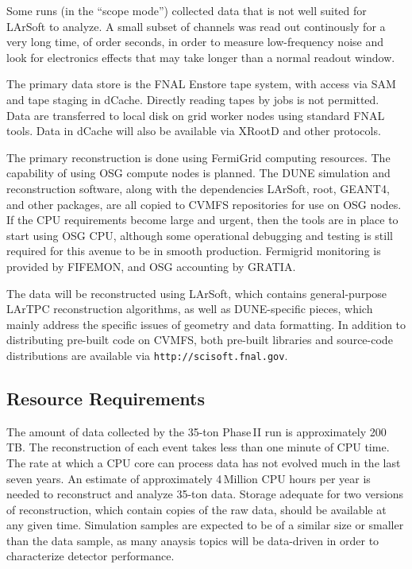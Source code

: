 \documentclass[12pt]{article}
\begin{document}
Some runs (in the ``scope mode'') collected data that is not well suited for LArSoft to analyze.  A small subset
of channels was read out continously for a very long time, of order seconds, in order to measure
low-frequency noise and look for electronics effects that may take longer than a normal readout window.

The primary data store is the  FNAL Enstore tape system, with access via SAM and tape staging in
dCache.  Directly reading tapes by jobs is not permitted.  Data are transferred to local disk on grid
worker nodes using standard FNAL tools.  Data in dCache will also be available via XRootD and other protocols.

The primary reconstruction is done using FermiGrid computing resources.  The capability
of using OSG compute nodes is planned.  The DUNE simulation and reconstruction software, along with the
dependencies LArSoft, root, GEANT4, and other packages, are all copied to CVMFS repositories for use on
OSG nodes.  If the CPU requirements become large and urgent, then the tools are in place to start using
OSG CPU, although some operational debugging and testing is still required for this avenue to be in smooth
production.  Fermigrid monitoring is provided by FIFEMON, and OSG accounting by GRATIA.

The data will be reconstructed using LArSoft, which contains general-purpose LArTPC reconstruction algorithms,
as well as DUNE-specific pieces, which mainly address the specific issues of geometry and data formatting.
In addition to distributing pre-built code on CVMFS, both pre-built libraries and source-code distributions
are available via {\tt http://scisoft.fnal.gov}.


\subsection{Resource Requirements}
\label{sec:35t-resource-requirements}
The amount of data collected by the 35-ton Phase\,II run is approximately 200\,TB. 
The reconstruction of each event takes less than one minute of CPU time.  The rate at which
a CPU core can process data has not evolved much in the last seven years.  An estimate of approximately
4\,Million CPU hours per year is needed to reconstruct and analyze 35-ton data.  Storage adequate for
two versions of reconstruction, which contain copies of the raw data, should be available at any given time.
Simulation samples are expected to be of a similar size or smaller than the data sample, as many anaysis
topics will be data-driven in order to characterize detector performance.
\end{document}
